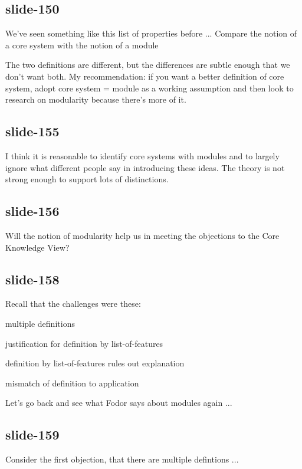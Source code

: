 \documentclass[12pt,\papersize]{extarticle}
\begin{document}
\subsection{slide-150}
We've seen something like this list of properties before ...
Compare the notion of a core system with the notion of a module

The two definitions are different, but the differences are subtle enough that we don't want both.
My recommendation: if you want a better definition of core system, adopt
core system = module as a working assumption and then look to research on modularity
because there's more of it.

\subsection{slide-155}
I think it is reasonable to identify core systems with modules and to
largely ignore what different people say in introducing these ideas.
The theory is not strong enough to support lots of distinctions.

\subsection{slide-156}
Will the notion of modularity help us in meeting the objections to the Core Knowledge View?

\subsection{slide-158}
Recall that the challenges were these:



multiple definitions


justification for definition by list-of-features


definition by list-of-features rules out explanation


mismatch of definition to application



Let’s go back and see what Fodor says about modules again ...

\subsection{slide-159}
Consider the first objection, that there are multiple defintions ...
\end{document}

